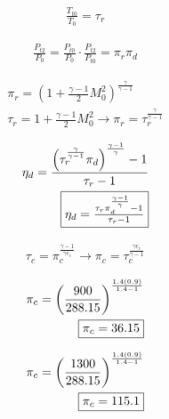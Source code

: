 \begin{align*}
    \frac{T_{t0}}{T_0}=\tau_r
\end{align*}

\begin{align*}
    \frac{P_{t2}}{P_0}=\frac{P_{t0}}{P_0}\cdot \frac{P_{t2}}{P_{t0}}=\pi_r \pi_d
\end{align*}

\begin{align*}
    \pi_r=\left(1+\frac{\gamma-1}{2}M_0^2\right)^{\frac{\gamma}{\gamma - 1}} \\
    \tau_r=1+\frac{\gamma-1}{2}M_0^2 \rightarrow \pi_r=\tau_r^{\frac{\gamma}{\gamma-1}}
\end{align*}

\begin{align*}
    \eta_d=\frac{\left(\tau_r^{\frac{\gamma}{\gamma-1}}\pi_d\right)^\frac{\gamma-1}{\gamma}-1}{\tau_r-1} \\
    \fbox{$\eta_d=\frac{\tau_r\pi_d^\frac{\gamma-1}{\gamma}-1}{\tau_r-1}$}
\end{align*}


\begin{align*}
    \tau_c=\pi_c^{\frac{\gamma-1}{\gamma e_c}} \rightarrow \pi_c=\tau_c^{\frac{\gamma e_c}{\gamma-1}}
\end{align*}

\begin{align*}
    \pi_c=\left(\frac{900}{288.15}\right)^{\frac{1.4(0.9)}{1.4-1}} \\
    \fbox{$\pi_c=36.15$}
\end{align*}

\begin{align*}
    \pi_c=\left(\frac{1300}{288.15}\right)^{\frac{1.4(0.9)}{1.4-1}} \\
    \fbox{$\pi_c=115.1$}
\end{align*}